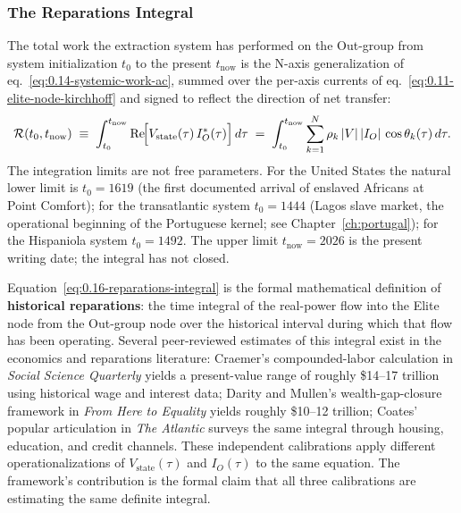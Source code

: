 \subsubsection*{The Reparations Integral}

The total work the extraction system has performed on the Out-group
from system initialization $t_0$ to the present $t_{\text{now}}$ is the
N-axis generalization of eq.~\eqref{eq:0.14-systemic-work-ac}, summed
over the per-axis currents of eq.~\eqref{eq:0.11-elite-node-kirchhoff}
and signed to reflect the direction of net transfer:
\begin{equation}\label{eq:0.16-reparations-integral}
\mathcal{R}(t_0, t_{\text{now}}) \;\equiv\; \int_{t_0}^{t_{\text{now}}} \operatorname{Re}\!\Bigl[V_{\text{state}}(\tau)\, I_{O}^{*}(\tau)\Bigr]\, d\tau \;=\; \int_{t_0}^{t_{\text{now}}} \sum_{k=1}^{N} \rho_k\, |V|\,|I_O|\,\cos\theta_k(\tau)\, d\tau.
\end{equation}
The integration limits are not free parameters. For the United States
the natural lower limit is $t_0 = 1619$ (the first documented arrival
of enslaved Africans at Point Comfort); for the transatlantic system
$t_0 = 1444$ (Lagos slave market, the operational beginning of the
Portuguese kernel; see Chapter~\ref{ch:portugal}); for the
Hispaniola system $t_0 = 1492$. The upper limit
$t_{\text{now}} = 2026$ is the present writing date; the integral has
not closed.

Equation~\eqref{eq:0.16-reparations-integral} is the formal
mathematical definition of \textbf{historical reparations}: the time integral of the real-power flow into the Elite node from the Out-group node over the historical interval during which that flow has been operating.
Several peer-reviewed estimates of this integral exist in the
economics and reparations literature: Craemer's
\citeyear{craemer2015slavery} compounded-labor calculation in
\textit{Social Science Quarterly} yields a present-value range of
roughly \$14--17 trillion using historical wage and interest data;
Darity and Mullen's \citeyear{darity_mullen}
wealth-gap-closure framework in \textit{From Here to Equality} yields
roughly \$10--12 trillion; Coates'
\citeyear{coates_case_for_reparations} popular articulation in
\textit{The Atlantic} surveys the same integral through housing,
education, and credit channels. These independent calibrations apply different operationalizations of $V_{\text{state}}(\tau)$ and $I_O(\tau)$
to the same equation. The framework's contribution is the formal claim that all three calibrations are estimating the same definite integral.

